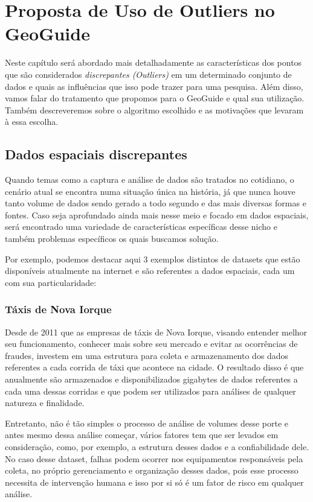 \chapter{Proposta de Uso de Outliers no GeoGuide}
\label{chap:outliers}

Neste capítulo será abordado mais detalhadamente as características dos pontos que são considerados \textit{discrepantes (Outliers)}  em um determinado conjunto de dados e quais as influências que isso pode trazer para uma pesquisa. Além disso, vamos falar do tratamento que propomos para o GeoGuide e qual sua utilização. Também descreveremos sobre o algoritmo escolhido e as motivações que levaram à essa escolha.

\section{Dados espaciais discrepantes}

Quando temas como a captura e análise de dados são tratados no cotidiano, o cenário atual se encontra numa situação única na história, já que nunca houve tanto volume de dados sendo gerado a todo segundo e das mais diversas formas e fontes. Caso seja aprofundado ainda mais nesse meio e focado em dados espaciais, será encontrado uma variedade de características específicas desse nicho e também problemas específicos os quais buscamos solução.

Por exemplo, podemos destacar aqui 3 exemplos distintos de datasets que estão disponíveis atualmente na internet e são referentes a dados espaciais, cada um com sua particularidade:

\subsection{Táxis de Nova Iorque}

Desde de 2011 que as empresas de táxis de Nova Iorque, visando entender melhor seu funcionamento, conhecer mais sobre seu mercado e evitar as ocorrências de fraudes, investem em uma estrutura para coleta e armazenamento dos dados referentes a cada corrida de táxi que acontece na cidade. O resultado disso é que anualmente são armazenados e disponibilizados gigabytes de dados referentes a cada uma dessas corridas e que podem ser utilizados para análises de qualquer natureza e finalidade.

Entretanto, não é tão simples o processo de análise de volumes desse porte e antes mesmo dessa análise começar, vários fatores tem que ser levados em consideração, como, por exemplo, a estrutura desses dados e a confiabilidade dele. No caso desse dataset, falhas podem ocorrer nos equipamentos responsáveis pela coleta, no próprio gerenciamento e organização desses dados, pois esse processo necessita de intervenção humana e isso por si só é um fator de risco em qualquer análise.

